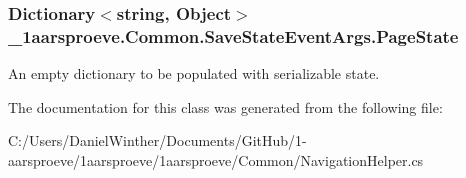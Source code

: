 \subsubsection[{Page\+State}]{\setlength{\rightskip}{0pt plus 5cm}Dictionary$<$string, Object$>$ \+\_\+1aarsproeve.\+Common.\+Save\+State\+Event\+Args.\+Page\+State\hspace{0.3cm}{\ttfamily [get]}}\label{class__1aarsproeve_1_1_common_1_1_save_state_event_args_a8c2a073606d2429d985a1747707c6c29}


An empty dictionary to be populated with serializable state. 



The documentation for this class was generated from the following file\+:\begin{DoxyCompactItemize}
\item 
C\+:/\+Users/\+Daniel\+Winther/\+Documents/\+Git\+Hub/1-\/aarsproeve/1aarsproeve/1aarsproeve/\+Common/Navigation\+Helper.\+cs\end{DoxyCompactItemize}
